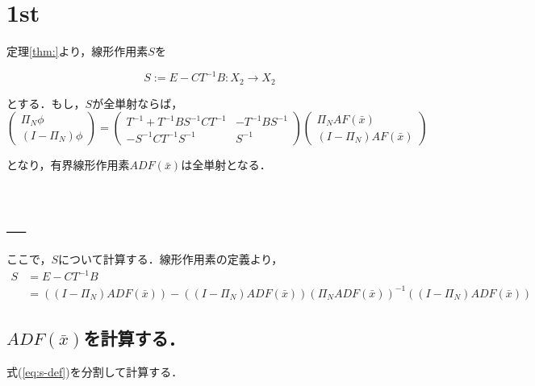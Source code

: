 \documentclass[11pt,a4paper,titlepage]{jsreport}
\theoremstyle{definition}
\begin{document}
\section*{1st}



定理\ref{thm:}より，線形作用素$S$を

\begin{equation}
  S := E-CT^{-1}B:X_2\rightarrow X_2
\end{equation}

とする．もし，$S$が全単射ならば，
\begin{equation*}
  \begin{pmatrix}
    \Pi_N \phi \\
    (I -\Pi_N) \phi
  \end{pmatrix}
  =
  \begin{pmatrix}
    T^{-1}+T^{-1}BS^{-1}CT^{-1} & -T^{-1}BS^{-1} \\
    -S^{-1}CT^{-1} S^{-1} & S^{-1}
  \end{pmatrix}
  \begin{pmatrix}
    \Pi_N A F(\bar{x}) \\
    (I - \Pi_N) A F(\bar{x})
  \end{pmatrix}
\end{equation*}

となり，有界線形作用素$ADF(\bar{x})$は全単射となる．

\section*{_}
ここで，$S$について計算する．線形作用素の定義より，
\begin{equation}
  \begin{split}
    S &= E-CT^{-1}B \\
    &= \left( \left( I-\Pi_N \right) ADF ( \bar{x} ) \right) - (\left( I-\Pi_N \right) ADF( \bar{x} )) (\Pi_N ADF(\bar{x}))^{-1} ((I-\Pi_N)ADF(\bar{x}))
  \end{split}
  \label{eq:s-def}
\end{equation}

\subsection*{$ADF(\bar{x})$を計算する．}
式(\ref{eq:s-def})を分割して計算する．
\end{document}
